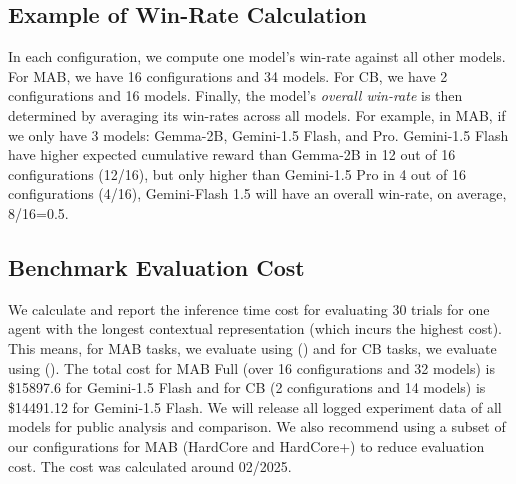 \subsection{Example of Win-Rate Calculation}
\label{sec:app:win-rate-example}
In each configuration, we compute one model's win-rate against all other models. For MAB, we have 16 configurations and 34 models. For CB, we have 2 configurations and 16 models. Finally, the model's \emph{overall win-rate} is then determined by averaging its win-rates across all models. For example, in MAB, if we only have 3 models: Gemma-2B, Gemini-1.5 Flash, and Pro. Gemini-1.5 Flash have higher expected cumulative reward than Gemma-2B in 12 out of 16 configurations (12/16), but only higher than Gemini-1.5 Pro in 4 out of 16 configurations (4/16), Gemini-Flash 1.5 will have an overall win-rate, on average, 8/16=0.5.

\subsection{Benchmark Evaluation Cost}

We calculate and report the inference time cost for evaluating 30 trials for one agent with the longest contextual representation (which incurs the highest cost). This means, for MAB tasks, we evaluate using \rah (\RH) and for CB tasks, we evaluate using \ag (\AG). The total cost for MAB Full (over 16 configurations and 32 models) is \$15897.6 for Gemini-1.5 Flash and for CB (2 configurations and 14 models) is \$14491.12 for Gemini-1.5 Flash. We will release all logged experiment data of all models for public analysis and comparison. We also recommend using a subset of our configurations for MAB (HardCore and HardCore+) to reduce evaluation cost. The cost was calculated around 02/2025.

